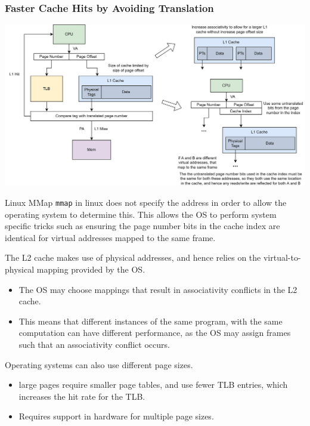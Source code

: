 \subsubsection{Faster Cache Hits by Avoiding Translation}
\begin{center}
    \includegraphics[width=\textwidth]{caches/images/fast_cache_hit_index_offset_bits.drawio.png}
\end{center}
\begin{sidenotebox}{Linux MMap}
    \texttt{mmap} in linux does not specify the address in order to allow the operating system to determine this. This allows the OS to perform system specific tricks such as ensuring the page number bits in the cache index are identical for virtual addresses mapped to the same frame.
\end{sidenotebox}
The L2 cache makes use of physical addresses, and hence relies on the virtual-to-physical mapping provided by the OS.
\begin{itemize}
    \item The OS may choose mappings that result in associativity conflicts in the L2 cache.
    \item This means that different instances of the same program, with the same computation can have different performance, as the OS may assign frames such that an associativity conflict occurs.
\end{itemize}
Operating systems can also use different page sizes.
\begin{itemize}
    \item large pages require smaller page tables, and use fewer TLB entries, which increases the hit rate for the TLB.
    \item Requires support in hardware for multiple page sizes.
\end{itemize}
